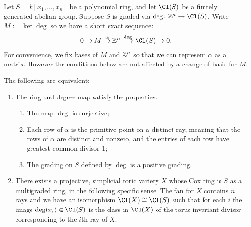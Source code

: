 \documentclass{amsart}
\begin{document}
\begin{prop}\label{prop:goodMultigradings}
Let $S=k[x_1, \dots, x_n]$ be a polynomial ring, and let $\Cl(S)$ be a finitely generated abelian group.
Suppose $S$ is graded via $\deg\colon \ZZ^n\to \Cl(S)$.  Write $M:=\ker \deg$ so we have a short exact sequence:
\[
0\to M\overset{\alpha}{\to} \ZZ^n \overset{\deg}{\longrightarrow} \Cl(S) \to 0.
\]
For convenience, we fix bases of $M$ and $\mathbb Z^n$ so that we can represent $\alpha$ as a matrix. However the conditions below are not affected by a change of basis for $M$.

The following are equivalent:
\begin{enumerate}
    \item The ring and degree map satisfy the properties:
      \begin{enumerate}
        \item The map $\deg$ is surjective;
        \item
        Each row of $\alpha$ is the primitive point on a distinct ray, meaning that the rows of
        $\alpha$ are distinct and nonzero, and the entries of each row have greatest common divisor 1;
        \item The grading on $S$ defined by $\deg$ is a positive grading.
    \end{enumerate}
    \item  There exists a projective, simplicial toric variety $X$ whose Cox ring is $S$ as a multigraded ring, in the following specific sense: The fan for $X$ contains $n$ rays and we have an isomorphism $\Cl(X)\cong \Cl(S)$ such that for each $i$ the image $\deg(x_i)\in \Cl(S)$ is the class in $\Cl(X)$ of the torus invariant divisor corresponding to the $i$th ray of $X$.
\end{enumerate}
\end{prop}
\end{document}
